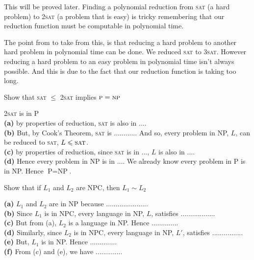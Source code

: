 
This will be proved later.
Finding a polynomial reduction from \textsc{sat} (a hard problem) 
to \textsc{2sat} (a problem that is easy)
is tricky remembering that our reduction function must be computable 
in polynomial time. 

The point from to take from this, is that reducing a hard problem 
to another hard problem in polynomial time can be done. 
We reduced \textsc{sat} to \textsc{3sat}. However reducing 
a hard problem to an easy problem in polynomial time isn't always 
possible. And this is due to the fact that our reduction function is 
taking too long. 

\frmrule

\begin{example}
Show that \textsc{sat} $\leqslant$ \textsc{2sat} implies $\textsc{p} = \textsc{np}$

\textsc{2sat} is in P \\
\textbf{(a)} by properties of reduction, \textsc{sat} is also in .... \\
\textbf{(b)} But, by Cook's Theorem, \textsc{sat} is ............ 
And so, every problem in NP, $L$, can be reduced to 
\textsc{sat}, $L \leqslant \textsc{sat}$. \\
\textbf{(c)} by properties of reduction, 
since \textsc{sat} is in ..., $L$ is also in .... \\
\textbf{(d)} Hence every problem in NP is in ....
We already know every problem in P is in NP. Hence $\text{P} = \text{NP}$.
\end{example}


\frmrule

\begin{example}
Show that if $L_1$ and $L_2$ are NPC, then $L_1 \sim L_2$

\textbf{(a)} $L_1$ and $L_2$ are in NP because ...................... \\ 
\textbf{(b)} Since $L_1$ is in NPC, every language in NP, $L$, satisfies .................. \\
\textbf{(c)} But from (a), $L_2$ is a language in NP. Hence .............. \\
\textbf{(d)} Similarly, since $L_2$ is in NPC, every language in NP, $L'$, satisfies ................ \\
\textbf{(e)} But, $L_1$ is in NP. Hence .............. \\
\textbf{(f)} From (c) and (e), we have ..............
\end{example}

